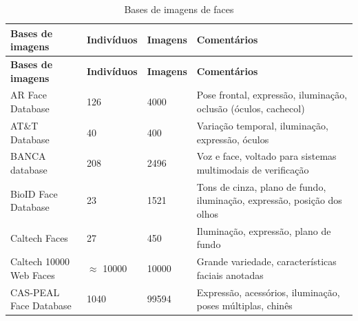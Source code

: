 \begin{longtabu} to 
\caption{Bases de imagens de faces}
\label{tab:bases_faces}\\
\textbf{Bases de imagens}                                                            & \textbf{Indivíduos}  & \textbf{Imagens}                & \textbf{Comentários}                                                    \\\hline
\endfirsthead
\textbf{Bases de imagens}                                                            & \textbf{Indivíduos}  & \textbf{Imagens}                & \textbf{Comentários}                                                    \\\hline
\endhead
AR Face Database                                  \cite{martinez1998ar}              & 126                  & 4000                            & Pose frontal, expressão, iluminação, oclusão (óculos, cachecol)         \\\hline
AT\&T Database                                    \cite{samaria1994parameterisation} & 40                   & 400                             & Variação temporal, iluminação, expressão, óculos                        \\\hline
BANCA database                                    \cite{bailly2003banca}             & 208                  & 2496                            & Voz e face, voltado para sistemas multimodais de verificação            \\\hline
BioID Face Database                               \cite{jesorsky2001robust}          & 23                   & 1521                            & Tons de cinza, plano de fundo, iluminação, expressão, posição dos olhos \\\hline
Caltech Faces                                     \cite{weber1995caltech}            & 27                   & 450                             & Iluminação, expressão, plano de fundo                                   \\\hline
Caltech 10000 Web Faces                           \cite{angelova2005pruning}         & $\approx$ 10000      & 10000                           & Grande variedade, características faciais anotadas                      \\\hline
CAS-PEAL Face Database                            \cite{gao2008cas}                  & 1040                 & 99594                           & Expressão, acessórios, iluminação, poses múltiplas, chinês              \\\hline

\end{longtabu}
